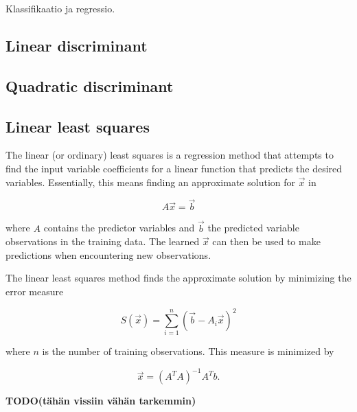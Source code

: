\documentclass[twoside]{article}
\newcommand{\todo}[1]{\textbf{TODO(#1)}}
\renewcommand{\v}[1]{\vec{#1}}
\begin{document}
\begin{multicols}{2}
Klassifikaatio ja regressio.

\subsection{Linear discriminant}

\subsection{Quadratic discriminant}

\subsection{Linear least squares}

The linear (or ordinary) least squares is a regression method that attempts to
find the input variable coefficients for a linear function that predicts the desired variables.
Essentially, this means finding an approximate solution for $\v{x}$ in

\begin{equation*}
 A\v{x} = \v{b}
\end{equation*}

where $A$ contains the predictor variables and $\v{b}$ the predicted variable observations
in the training data. The learned $\v{x}$ can then be used to make predictions when encountering
new observations.

The linear least squares method finds the approximate solution by minimizing the error measure

\begin{equation}
 S(\v{x}) = \sum_{i=1}^n (\v{b} - A_i \v{x})^2
\end{equation}

where $n$ is the number of training observations. This measure is minimized by

\begin{equation}
 \v{x} = (A^T A)^{-1} A^T b.
\end{equation}

\todo{tähän vissiin vähän tarkemmin}




\end{multicols}
\end{document}
